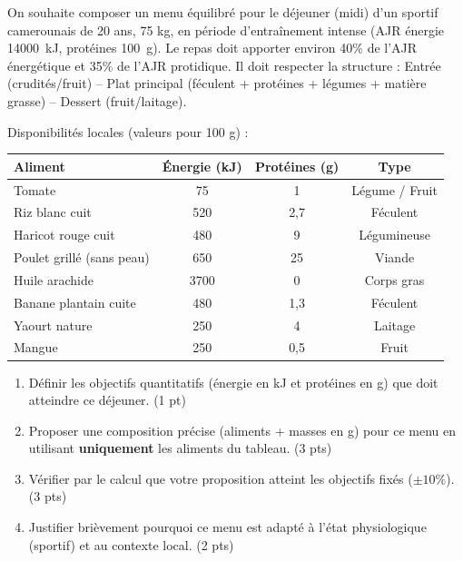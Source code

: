 \documentclass[11pt]{article}
\begin{document}
\begin{exercice}
On souhaite composer un menu équilibré pour le déjeuner (midi) d'un sportif camerounais de 20 ans, 75 kg, en période d'entraînement intense (AJR énergie \SI{14000}{kJ}, protéines \SI{100}{g}). Le repas doit apporter environ 40\% de l'AJR énergétique et 35\% de l'AJR protidique. Il doit respecter la structure : Entrée (crudités/fruit) -- Plat principal (féculent + protéines + légumes + matière grasse) -- Dessert (fruit/laitage).

Disponibilités locales (valeurs pour 100 g) :
\begin{tabular}{|l|c|c|c|}
\hline
Aliment & Énergie (kJ) & Protéines (g) & Type \\
\hline
Tomate & 75 & 1 & Légume / Fruit \\
\hline
Riz blanc cuit & 520 & 2,7 & Féculent \\
\hline
Haricot rouge cuit & 480 & 9 & Légumineuse \\
\hline
Poulet grillé (sans peau) & 650 & 25 & Viande \\
\hline
Huile arachide & 3700 & 0 & Corps gras \\
\hline
Banane plantain cuite & 480 & 1,3 & Féculent \\
\hline
Yaourt nature & 250 & 4 & Laitage \\
\hline
Mangue & 250 & 0,5 & Fruit \\
\hline
\end{tabular}

\begin{enumerate}
\item Définir les objectifs quantitatifs (énergie en kJ et protéines en g) que doit atteindre ce déjeuner. \hfill (1 pt)
\item Proposer une composition précise (aliments + masses en g) pour ce menu en utilisant \textbf{uniquement} les aliments du tableau. \hfill (3 pts)
\item Vérifier par le calcul que votre proposition atteint les objectifs fixés ($\pm 10\%$). \hfill (3 pts)
\item Justifier brièvement pourquoi ce menu est adapté à l'état physiologique (sportif) et au contexte local. \hfill (2 pts)
\end{enumerate}
\end{exercice}
\end{document}
